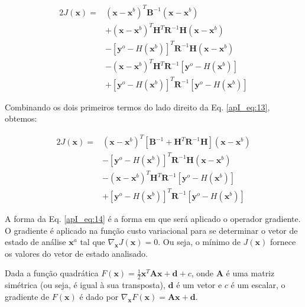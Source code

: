 \begin{equation}
  \label{apI_eq:13}
  \begin{aligned}
    2J(\mathbf{x}) = {} & (\mathbf{x} - \mathbf{x}^{b})^{T}\mathbf{B}^{-1}(\mathbf{x} - \mathbf{x}^{b}) \\
    & + (\mathbf{x} - \mathbf{x}^{b})^{T}\mathbf{H}^{T}\mathbf{R}^{-1}\mathbf{H}(\mathbf{x} - \mathbf{x}^{b}) \\
                & - [\mathbf{y}^{o} - \textit{H}(\mathbf{x}^{b})]^{T}\mathbf{R}^{-1}\mathbf{H}(\mathbf{x} - \mathbf{x}^{b}) \\
                & - (\mathbf{x} - \mathbf{x}^{b})^{T}\mathbf{H}^{T}\mathbf{R}^{-1}[\mathbf{y}^{o} - \textit{H}(\mathbf{x}^{b})] \\
                & + [\mathbf{y}^{o} - \textit{H}(\mathbf{x}^{b})]^{T}\mathbf{R}^{-1}[\mathbf{y}^{o} - \textit{H}(\mathbf{x}^{b})]
  \end{aligned}  
\end{equation}

Combinando os dois primeiros termos do lado direito da Eq. \ref{apI_eq:13}, obtemos:

\begin{equation}
  \label{apI_eq:14}
  \begin{aligned}
    2J(\mathbf{x}) = {} & (\mathbf{x} - \mathbf{x}^{b})^{T}[\mathbf{B}^{-1} + \mathbf{H}^{T}\mathbf{R}^{-1}\mathbf{H}](\mathbf{x} - \mathbf{x}^{b}) \\
                & - [\mathbf{y}^{o} - \textit{H}(\mathbf{x}^{b})]^{T}\mathbf{R}^{-1}\mathbf{H}(\mathbf{x} - \mathbf{x}^{b}) \\
                & - (\mathbf{x} - \mathbf{x}^{b})^{T}\mathbf{H}^{T}\mathbf{R}^{-1}[\mathbf{y}^{o} - \textit{H}(\mathbf{x}^{b})] \\
                & + [\mathbf{y}^{o} - \textit{H}(\mathbf{x}^{b})]^{T}\mathbf{R}^{-1}[\mathbf{y}^{o} - \textit{H}(\mathbf{x}^{b})]
  \end{aligned}  
\end{equation}

A forma da Eq. \ref{apI_eq:14} é a forma em que será aplicado o operador gradiente. O gradiente é aplicado na função custo variacional para se determinar o vetor de estado de análise $\mathbf{x}^{a}$ tal que $\nabla_{\mathbf{x}}{J(\mathbf{x})} = 0$. Ou seja, o mínimo de $J(\mathbf{x})$ fornece os valores do vetor de estado analisado.\\

\begin{teorema}
\label{apI_teo1}
Dada a função quadrática $F(\mathbf{x}) = \frac{1}{2}\mathbf{x}^{T}\mathbf{A}\mathbf{x} + \mathbf{d} + c$, onde $\mathbf{A}$ é uma matriz simétrica (ou seja, é igual à sua transposta), $\mathbf{d}$ é um vetor e $c$ é um escalar, o gradiente de $F(\mathbf{x})$ é dado por $\nabla_{\mathbf{x}}{F(\mathbf{x})} = \mathbf{A}\mathbf{x} + \mathbf{d}$.
\end{teorema}

